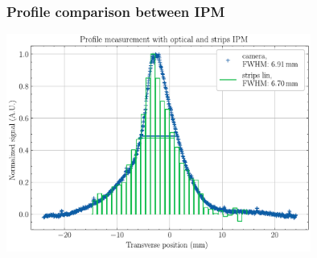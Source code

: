 \begin{frame}
  \frametitle{Profile comparison between IPM}

  \begin{center}
    \includegraphics[width=0.75\textwidth]{04_Test/fig/fig000_MCP_strip}
  \end{center}
\end{frame}

